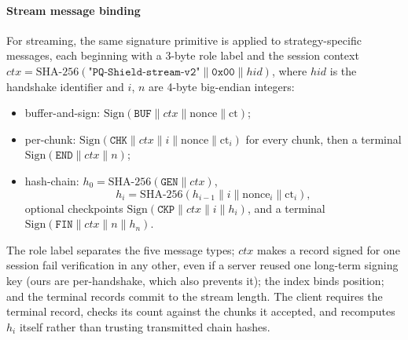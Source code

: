 \documentclass[conference]{IEEEtran}
\begin{document}
\paragraph*{Stream message binding}\label{sec:binding}
For streaming, the same signature primitive is applied to strategy-specific messages, each beginning
with a 3-byte role label and the session context
$\mathit{ctx}=\text{SHA-256}(\texttt{"PQ-Shield-stream-v2"}\parallel\texttt{0x00}\parallel\mathit{hid})$,
where $\mathit{hid}$ is the handshake identifier and $i$, $n$ are 4-byte big-endian integers:
\begin{itemize}
  \item buffer-and-sign: $\mathrm{Sign}(\texttt{BUF}\parallel\mathit{ctx}\parallel\text{nonce}\parallel\text{ct})$;
  \item per-chunk: $\mathrm{Sign}(\texttt{CHK}\parallel\mathit{ctx}\parallel i\parallel\text{nonce}\parallel\text{ct}_i)$
  for every chunk, then a terminal $\mathrm{Sign}(\texttt{END}\parallel\mathit{ctx}\parallel n)$;
  \item hash-chain: $h_0=\text{SHA-256}(\texttt{GEN}\parallel\mathit{ctx})$,
  \begin{equation}
  h_i = \text{SHA-256}(h_{i-1} \parallel i \parallel \text{nonce}_i \parallel \text{ct}_i),
  \end{equation}
  optional checkpoints $\mathrm{Sign}(\texttt{CKP}\parallel\mathit{ctx}\parallel i\parallel h_i)$,
  and a terminal $\mathrm{Sign}(\texttt{FIN}\parallel\mathit{ctx}\parallel n\parallel h_n)$.
\end{itemize}
The role label separates the five message types; $\mathit{ctx}$ makes a record signed for one session
fail verification in any other, even if a server reused one long-term signing key (ours are
per-handshake, which also prevents it); the index binds position; and the terminal records commit to
the stream length. The client requires the terminal record, checks its count against the chunks it
accepted, and recomputes $h_i$ itself rather than trusting transmitted chain hashes.
\end{document}
